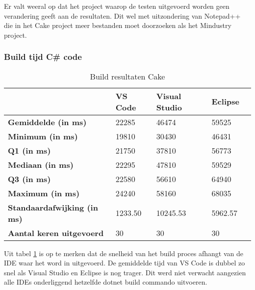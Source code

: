 Er valt weeral op dat het project waarop de testen uitgevoerd worden geen verandering geeft aan de resultaten. Dit wel met uitzondering van Notepad++ die in het Cake project meer bestanden moet doorzoeken als het Mindustry project.

\newpage

\subsubsection{Build tijd C\# code}

\begin{table}[h]
	\centering
	\begin{tabular}{ l l l l l }
		\hline
		                                    & \textbf{VS Code} & \textbf{Visual Studio} & \textbf{Eclipse} \\
		\hline
		\textbf{Gemiddelde (in ms)}         & 22285            & 46474                  & 59525            \\[1ex]

		\textbf{Minimum (in ms) }           & 19810            & 30430                  & 46431            \\
		\textbf{Q1 (in ms)}                 & 21750            & 37810                  & 56773            \\
		\textbf{Mediaan (in ms)}            & 22295            & 47810                  & 59529            \\
		\textbf{Q3 (in ms)}                 & 22580            & 56610                  & 64940            \\
		\textbf{Maximum (in ms)}            & 24240            & 58160                  & 68035            \\[1ex]

		\textbf{Standaardafwijking (in ms)} & 1233.50          & 10245.53               & 5962.57          \\
		\textbf{Aantal keren uitgevoerd}    & 30               & 30                     & 30               \\
		\hline
	\end{tabular}
	\caption{Build resultaten Cake}
	\label{tab:resultatenBuildCake}
\end{table}

Uit tabel \ref{tab:resultatenBuildCake} is op te merken dat de snelheid van het build proces afhangt van de IDE waar het word in uitgevoerd. De gemiddelde tijd van VS Code is dubbel zo snel als Visual Studio en Eclipse is nog trager. Dit werd niet verwacht aangezien alle IDEs onderliggend hetzelfde dotnet build commando uitvoeren.

